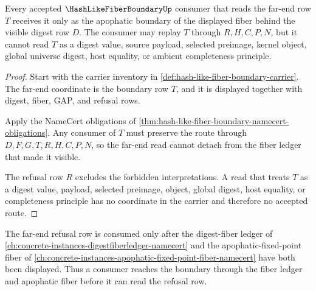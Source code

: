 \begin{theorem}
\label{thm:hash-like-fiber-boundary-noninternalization}
Every accepted $\HashLikeFiberBoundaryUp$ consumer that reads the far-end row
$T$ receives it only as the apophatic boundary of the displayed fiber behind
the visible digest row $D$. The consumer may replay $T$ through $R,H,C,P,N$,
but it cannot read $T$ as a digest value, source payload, selected preimage,
kernel object, global universe digest, host equality, or ambient completeness
principle.
\end{theorem}
\begin{proof}
Start with the carrier inventory in
\autoref{def:hash-like-fiber-boundary-carrier}. The far-end coordinate is the
boundary row $T$, and it is displayed together with digest, fiber, GAP, and
refusal rows.

Apply the NameCert obligations of
\autoref{thm:hash-like-fiber-boundary-namecert-obligations}. Any consumer of
$T$ must preserve the route through $D,F,G,T,R,H,C,P,N$, so the far-end read
cannot detach from the fiber ledger that made it visible.

The refusal row $R$ excludes the forbidden interpretations. A read that treats
$T$ as a digest value, payload, selected preimage, object, global digest, host
equality, or completeness principle has no coordinate in the carrier and
therefore no accepted route.
\end{proof}

The far-end refusal row is consumed only after the digest-fiber ledger of
\autoref{ch:concrete-instances-digestfiberledger-namecert} and the
apophatic-fixed-point fiber of
\autoref{ch:concrete-instances-apophatic-fixed-point-fiber-namecert} have both
been displayed. Thus a consumer reaches the boundary through the fiber ledger
and apophatic fiber before it can read the refusal row.


